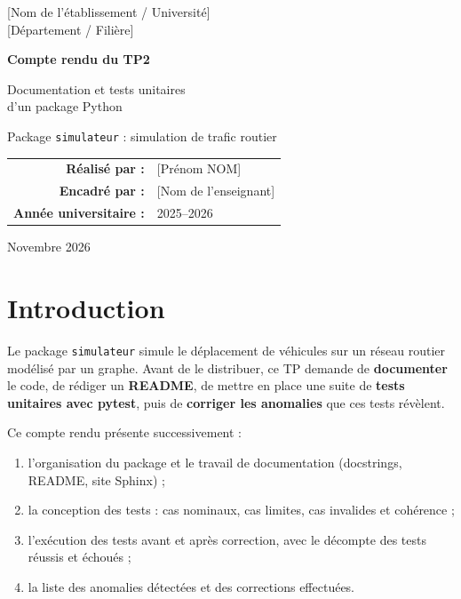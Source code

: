 \documentclass[12pt,a4paper]{report}
\begin{document}
\begin{titlepage}
\centering
{\large [Nom de l'établissement / Université]}\\[0.4cm]
{\large [Département / Filière]}\\[3cm]
{\Huge\bfseries Compte rendu du TP2\par}
\vspace{0.6cm}
{\LARGE Documentation et tests unitaires\\d'un package Python\par}
\vspace{0.6cm}
{\large Package \texttt{simulateur} : simulation de trafic routier\par}
\vspace{3cm}
\begin{tabular}{rl}
\textbf{Réalisé par :} & [Prénom NOM] \\[4pt]
\textbf{Encadré par :} & [Nom de l'enseignant] \\[4pt]
\textbf{Année universitaire :} & 2025--2026 \\
\end{tabular}
\vfill
{\large Novembre 2026}
\end{titlepage}

\tableofcontents
\listoffigures
\listoftables

\chapter*{Introduction}
Le package \texttt{simulateur} simule le déplacement de véhicules sur un réseau routier modélisé
par un graphe. Avant de le distribuer, ce TP demande de \textbf{documenter} le code, de rédiger un
\textbf{README}, de mettre en place une suite de \textbf{tests unitaires avec pytest}, puis de
\textbf{corriger les anomalies} que ces tests révèlent.

Ce compte rendu présente successivement :
\begin{enumerate}
  \item l'organisation du package et le travail de documentation (docstrings, README, site Sphinx) ;
  \item la conception des tests : cas nominaux, cas limites, cas invalides et cohérence ;
  \item l'exécution des tests avant et après correction, avec le décompte des tests réussis et échoués ;
  \item la liste des anomalies détectées et des corrections effectuées.
\end{enumerate}
\end{document}
